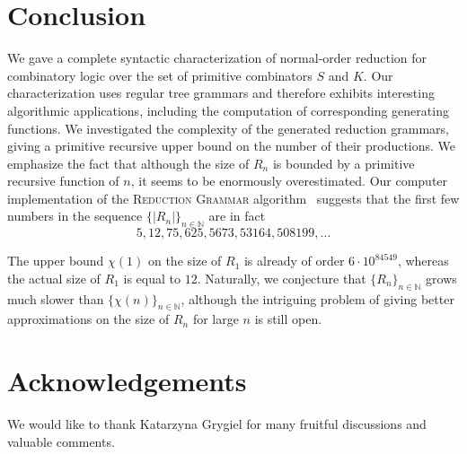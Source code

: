 \documentclass[11pt,a4paper]{amsart}
\theoremstyle{definition}
\begin{document}
\section{Conclusion}\label{sec:conclusion}
We gave a complete syntactic characterization of normal-order reduction for combinatory logic over the set of primitive combinators $S$ and $K$. Our characterization uses regular tree grammars and therefore exhibits interesting
 algorithmic applications, including the computation of corresponding generating functions. We investigated the complexity of the generated reduction grammars, giving a primitive recursive upper bound on the number of their productions. We emphasize the fact that although the size of $R_n$ is bounded by a primitive recursive function of $n$, it seems to be enormously overestimated. Our computer implementation of the \textsc{Reduction Grammar} algorithm~\cite{mb-haskell-implementation} suggests that the first few numbers in the sequence ${\{|R_n|\}}_{n\in\mathbb{N}}$ are in fact
\[ 5, 12, 75, 625, 5673, 53164, 508199, \ldots \]

\vspace{2mm}
The upper bound $\chi(1)$ on the size of $R_1$ is already of order $6 \cdot 10^{84549}$, whereas the actual size of $R_1$ is equal to $12$. Naturally,
we conjecture that ${\{R_n\}}_{n\in\mathbb{N}}$ grows much slower than
${\{\chi(n)\}}_{n\in\mathbb{N}}$, although the intriguing problem of 
giving better approximations on the size of $R_n$ for large $n$
 is still open.
 
\section*{Acknowledgements}
We would like to thank Katarzyna Grygiel for many fruitful discussions and valuable comments.



\end{document}
